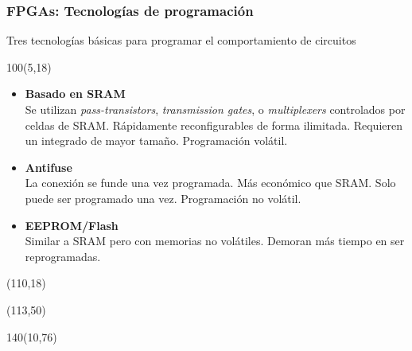 \documentclass[aspectratio=169]{beamer}
\begin{document}
\begin{frame}[fragile,t]
    \frametitle{FPGAs: Tecnologías de programación}
    Tres tecnologías básicas para programar el comportamiento de circuitos
    \begin{textblock}{100}(5,18)
    \begin{itemize}
    \setlength\itemsep{0.3cm}
    \item<1-> \small \textbf{Basado en SRAM}\\ %
    Se utilizan \emph{pass-transistors}, \emph{transmission gates}, o \emph{multiplexers} controlados por celdas de SRAM.
    Rápidamente reconfigurables de forma ilimitada. Requieren un integrado de mayor tamaño.
    Programación volátil.
    \item<2-> \small \textbf{Antifuse}\\ %
    La conexión se funde una vez programada. Más económico que SRAM. Solo puede ser programado una vez. Programación no volátil.
    \item<3-> \small \textbf{EEPROM/Flash}\\ %
    Similar a SRAM pero con memorias no volátiles. Demoran más tiempo en ser reprogramadas.
    \end{itemize}
    \end{textblock}
    \begin{textblock}{90}(110,18)  \end{textblock}
    \begin{textblock}{90}(113,50)  \end{textblock}
    \begin{textblock}{140}(10,76) \small
    \end{textblock}
\end{frame}
\end{document}
